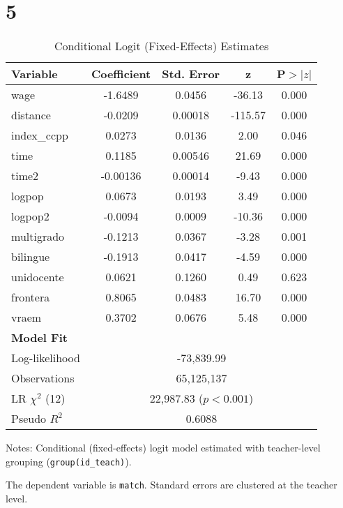 \documentclass{article}
\begin{document}
\section{5}


\begin{table}[H]
\centering
\caption{Conditional Logit (Fixed-Effects) Estimates}
\label{tab:clogit_results}
\begin{threeparttable}
\begin{tabular}{lcccc}
\toprule
Variable & Coefficient & Std. Error & z & P$>|z|$ \\
\midrule
wage            & -1.6489  & 0.0456 & -36.13 & 0.000 \\
distance        & -0.0209  & 0.00018 & -115.57 & 0.000 \\
index\_ccpp     &  0.0273  & 0.0136 & 2.00 & 0.046 \\
time            &  0.1185  & 0.00546 & 21.69 & 0.000 \\
time2           & -0.00136 & 0.00014 & -9.43 & 0.000 \\
logpop          &  0.0673  & 0.0193 & 3.49 & 0.000 \\
logpop2         & -0.0094  & 0.0009 & -10.36 & 0.000 \\
multigrado      & -0.1213  & 0.0367 & -3.28 & 0.001 \\
bilingue        & -0.1913  & 0.0417 & -4.59 & 0.000 \\
unidocente      &  0.0621  & 0.1260 & 0.49  & 0.623 \\
frontera        &  0.8065  & 0.0483 & 16.70 & 0.000 \\
vraem           &  0.3702  & 0.0676 & 5.48  & 0.000 \\
\midrule
\textbf{Model Fit} & & & & \\
Log-likelihood   & \multicolumn{4}{c}{-73,839.99} \\
Observations     & \multicolumn{4}{c}{65,125,137} \\
LR $\chi^2$ (12) & \multicolumn{4}{c}{22,987.83 ($p<0.001$)} \\
Pseudo $R^2$     & \multicolumn{4}{c}{0.6088} \\
\bottomrule
\end{tabular}
\begin{tablenotes}
\footnotesize
\item Notes: Conditional (fixed-effects) logit model estimated with teacher-level grouping (\texttt{group(id\_teach)}). 
\item The dependent variable is \texttt{match}. Standard errors are clustered at the teacher level.
\end{tablenotes}
\end{threeparttable}
\end{table}
\end{document}
